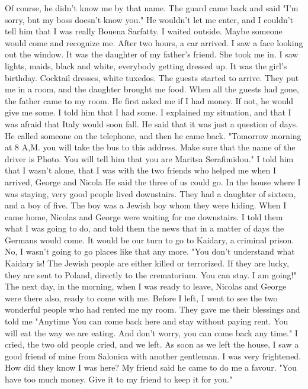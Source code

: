Of course, he didn't know 
me by that name.
The guard came back and said "I'm sorry, but my boss 
doesn't know you."
He wouldn't let me enter, and I couldn't tell him 
that I was really Bouena Sarfatty.
I waited outside.
Maybe someone would 
come and recognize me.
After two hours, a car arrived.
I saw a face 
looking out the window.
It was the daughter of my father's friend.
She 
took me in.
I saw lights, maids, black and white, everybody getting 
dressed up.
It was the girl's birthday.
Cocktail dresses, white tuxedos.
The guests started to arrive.
They put me in a room, and the daughter brought me food.
When all 
the guests had gone, the father came to my room.
He first asked me if 
I had money.
If not, he would give me some.
I told him that I had some.
I explained my situation, and that I was afraid that Italy would soon 
fall.
He said that it was just a question of days.
He called someone 
on the telephone, and then he came back.
"Tomorrow morning at 8 A,M.
you will take the bus to this address.
Make sure that the name of the 
driver is Photo.
You will tell him that you are Maritsa Serafimidou."
I told him that I wasn't alone, that I was with the two friends who helped 
me when I arrived, George and Nicola He said the three of us could go.
In the house where I was staying, very good people lived downstairs.
They had a daughter of sixteen, and a boy of five.
The boy was a Jewish 
boy whom they were hiding.
When I came home, Nicolas and George were 
waiting for me downstairs.
I told them what I was going to do, and told 
them the news that in a matter of days the Germans would come.
It would 
be our turn to go to Kaidary, a criminal prison.
No, I wasn't going to 
go places like that any more.
"You don't understand what Kaidary is!
The Jewish people are either killed or terrorized.
If they are lucky, 
they are sent to Poland, directly to the crematorium.
You can stay.
I 
am going!"
The next day, in the morning, when I was ready to leave, Nicolas and 
George were there also, ready to come with me.
Before I left, I went 
to see the two wonderful people who had rented me my room.
They gave 
me their blessings and told me "Anytime You can come back here and stay without paying rent.
You will eat the way we are eating.
And don't worry, you can come back any time."
I cried, the two old people cried, and we left.
As soon as we left the house, I saw a good friend of mine from Salonica with another gentleman.
I was very frightened.
How did they know I was here?
My friend said he came to do me a favour.
"You have too much money.
Give it to my friend to keep it for you."
